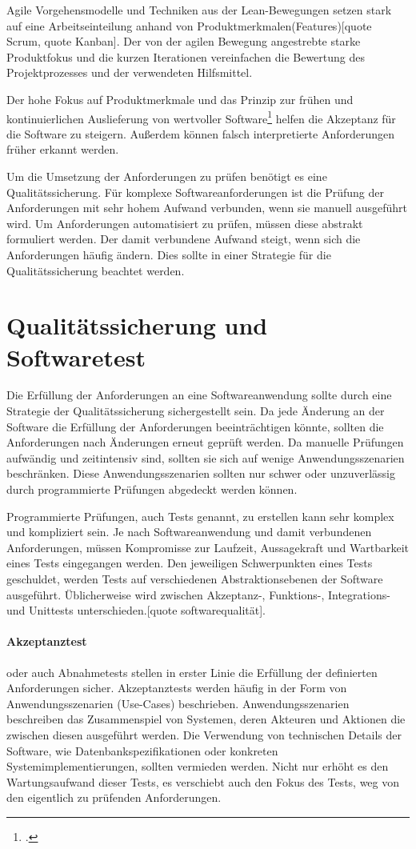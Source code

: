 Agile Vorgehensmodelle und Techniken aus der Lean-Bewegungen setzen stark auf eine Arbeitseinteilung anhand von Produktmerkmalen(Features)[quote Scrum, quote Kanban]. Der von der agilen Bewegung angestrebte starke Produktfokus und die kurzen Iterationen vereinfachen die Bewertung des Projektprozesses und der verwendeten Hilfsmittel.

Der hohe Fokus auf Produktmerkmale und das Prinzip zur frühen und kontinuierlichen Auslieferung von wertvoller Software\footcite{agile-manifest-principles} helfen die Akzeptanz für die Software zu steigern. Außerdem können falsch interpretierte Anforderungen früher erkannt werden. 

Um die Umsetzung der Anforderungen zu prüfen benötigt es eine Qualitätssicherung. Für komplexe Softwareanforderungen ist die Prüfung der Anforderungen mit sehr hohem Aufwand verbunden, wenn sie manuell ausgeführt wird. Um Anforderungen automatisiert zu prüfen, müssen diese abstrakt formuliert werden. Der damit verbundene Aufwand steigt, wenn sich die Anforderungen häufig ändern. Dies sollte in einer Strategie für die Qualitätssicherung beachtet werden. 

\section{Qualitätssicherung und Softwaretest}

Die Erfüllung der Anforderungen an eine Softwareanwendung sollte durch eine Strategie der Qualitätssicherung sichergestellt sein. Da jede Änderung an der Software die Erfüllung der Anforderungen beeinträchtigen könnte, sollten die Anforderungen nach Änderungen erneut geprüft werden. Da manuelle Prüfungen aufwändig und zeitintensiv sind, sollten sie sich auf wenige Anwendungsszenarien beschränken. Diese Anwendungsszenarien sollten nur schwer oder unzuverlässig durch programmierte Prüfungen abgedeckt werden können.

Programmierte Prüfungen, auch Tests genannt, zu erstellen kann sehr komplex und kompliziert sein. Je nach Softwareanwendung und damit verbundenen Anforderungen, müssen Kompromisse zur Laufzeit, Aussagekraft und Wartbarkeit eines Tests eingegangen werden.
Den jeweiligen Schwerpunkten eines Tests geschuldet, werden Tests auf verschiedenen Abstraktionsebenen der Software ausgeführt. Üblicherweise wird zwischen Akzeptanz-, Funktions-, Integrations- und Unittests unterschieden.[quote softwarequalität]. 

\paragraph{Akzeptanztest}
oder auch Abnahmetests stellen in erster Linie die Erfüllung der definierten Anforderungen sicher. Akzeptanztests werden häufig in der Form von Anwendungsszenarien (Use-Cases) beschrieben. Anwendungsszenarien beschreiben das Zusammenspiel von Systemen, deren Akteuren und Aktionen die zwischen diesen ausgeführt werden. Die Verwendung von technischen Details der Software, wie Datenbankspezifikationen oder konkreten Systemimplementierungen, sollten vermieden werden. Nicht nur erhöht es den Wartungsaufwand dieser Tests, es verschiebt auch den Fokus des Tests, weg von den eigentlich zu prüfenden Anforderungen.


